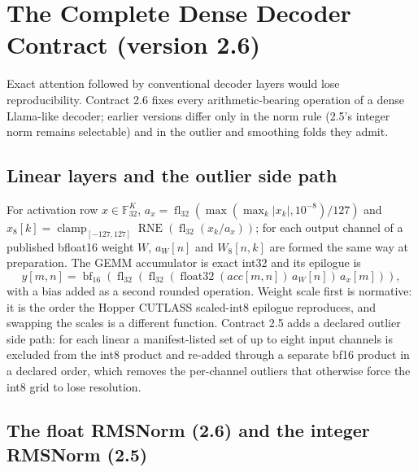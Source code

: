 \documentclass{article}
\newcommand{\Fth}{\mathbb{F}_{32}}
\newcommand{\fl}{\operatorname{fl}_{32}}
\newcommand{\bfround}{\operatorname{bf}_{16}}
\newcommand{\rne}{\operatorname{RNE}}
\begin{document}
\section{The Complete Dense Decoder Contract (version 2.6)}
\label{sec:decoder}

Exact attention followed by conventional decoder layers would lose reproducibility.  Contract
2.6 fixes every arithmetic-bearing operation of a dense Llama-like decoder; earlier versions
differ only in the norm rule (2.5's integer norm remains selectable) and in the outlier and
smoothing folds they admit.

\subsection{Linear layers and the outlier side path}

For activation row $x\in\Fth^K$, $a_x=\fl(\max(\max_k|x_k|,10^{-8})/127)$ and
$x_8[k]=\operatorname{clamp}_{[-127,127]}\rne(\fl(x_k/a_x))$; for each output channel of a
published bfloat16 weight $W$, $a_W[n]$ and $W_8[n,k]$ are formed the same way at
preparation.  The GEMM accumulator is exact int32 and its epilogue is
\begin{equation}
 y[m,n]=\bfround\!\left(\fl\!\left(\fl(\operatorname{float32}(acc[m,n])\,a_W[n])\,a_x[m]\right)\right),
 \label{eq:linear}
\end{equation}
with a bias added as a second rounded operation.  Weight scale first is normative: it is the
order the Hopper CUTLASS scaled-int8 epilogue reproduces, and swapping the scales is a
different function.  Contract 2.5 adds a declared outlier side path: for each linear a
manifest-listed set of up to eight input channels is excluded from the int8 product and
re-added through a separate bf16 product in a declared order, which removes the
per-channel outliers that otherwise force the int8 grid to lose resolution.

\subsection{The float RMSNorm (2.6) and the integer RMSNorm (2.5)}
\end{document}
